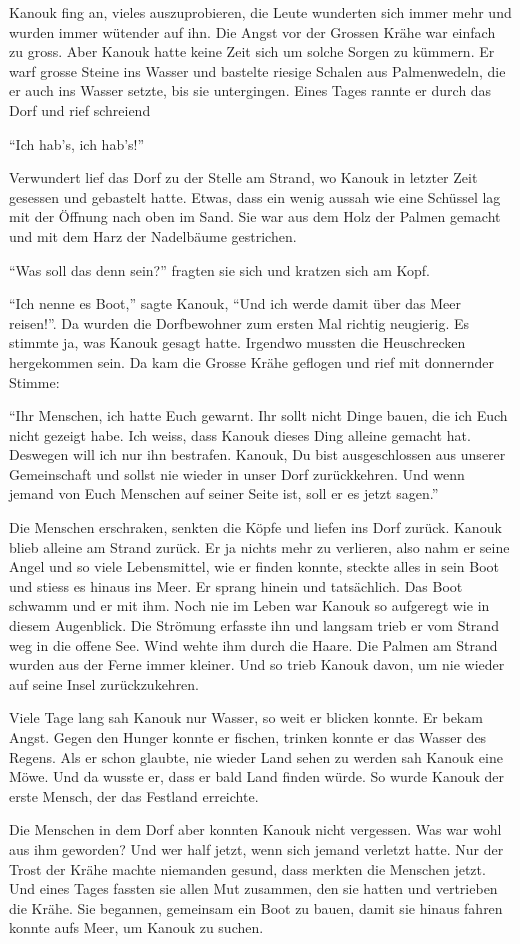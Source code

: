 Kanouk fing an, vieles auszuprobieren, die Leute wunderten sich immer mehr und wurden immer wütender auf ihn. Die Angst vor der Grossen Krähe war einfach zu gross. Aber Kanouk hatte keine Zeit sich um solche Sorgen zu kümmern. Er warf grosse Steine ins Wasser und bastelte riesige Schalen aus Palmenwedeln, die er auch ins Wasser setzte, bis sie untergingen. Eines Tages rannte er durch das Dorf und rief schreiend 

\enquote{Ich hab's, ich hab's!}

Verwundert lief das Dorf zu der Stelle am Strand, wo Kanouk in letzter Zeit gesessen und gebastelt hatte. Etwas, dass ein wenig aussah wie eine Schüssel lag mit der Öffnung nach oben im Sand. Sie war aus dem Holz der Palmen gemacht und mit dem Harz der Nadelbäume gestrichen. 

\enquote{Was soll das denn sein?} fragten sie sich und kratzen sich am Kopf. 

\enquote{Ich nenne es Boot,} sagte Kanouk, \enquote{Und ich werde damit über das Meer reisen!}. Da wurden die Dorfbewohner zum ersten Mal richtig neugierig. Es stimmte ja, was Kanouk gesagt hatte. Irgendwo mussten die Heuschrecken hergekommen sein. Da kam die Grosse Krähe geflogen und rief mit donnernder Stimme:

\enquote{Ihr Menschen, ich hatte Euch gewarnt. Ihr sollt nicht Dinge bauen, die ich Euch nicht gezeigt habe. Ich weiss, dass Kanouk dieses Ding alleine gemacht hat. Deswegen will ich nur ihn bestrafen. Kanouk, Du bist ausgeschlossen aus unserer Gemeinschaft und sollst nie wieder in unser Dorf zurückkehren. Und wenn jemand von Euch Menschen auf seiner Seite ist, soll er es jetzt sagen.}

Die Menschen erschraken, senkten die Köpfe und liefen ins Dorf zurück. Kanouk blieb alleine am Strand zurück. Er ja nichts mehr zu verlieren, also nahm er seine Angel und so viele Lebensmittel, wie er finden konnte, steckte alles in sein Boot und stiess es hinaus ins Meer. Er sprang hinein und tatsächlich. Das Boot schwamm und er mit ihm. Noch nie im Leben war Kanouk so aufgeregt wie in diesem Augenblick. Die Strömung erfasste ihn und langsam trieb er vom Strand weg in die offene See. Wind wehte ihm durch die Haare. Die Palmen am Strand wurden aus der Ferne immer kleiner. Und so trieb Kanouk davon, um nie wieder auf seine Insel zurückzukehren.

Viele Tage lang sah Kanouk nur Wasser, so weit er blicken konnte. Er bekam Angst. Gegen den Hunger konnte er fischen, trinken konnte er das Wasser des Regens. Als er schon glaubte, nie wieder Land sehen zu werden sah Kanouk eine Möwe. Und da wusste er, dass er bald Land finden würde. So wurde Kanouk der erste Mensch, der das Festland erreichte.

Die Menschen in dem Dorf aber konnten Kanouk nicht vergessen. Was war wohl aus ihm geworden? Und wer half jetzt, wenn sich jemand verletzt hatte. Nur der Trost der Krähe machte niemanden gesund, dass merkten die Menschen jetzt. Und eines Tages fassten sie allen Mut zusammen, den sie hatten und vertrieben die Krähe. Sie begannen, gemeinsam ein Boot zu bauen, damit sie hinaus fahren konnte aufs Meer, um Kanouk zu suchen. \hfill {\color{DeepPink}\decofourleft}
